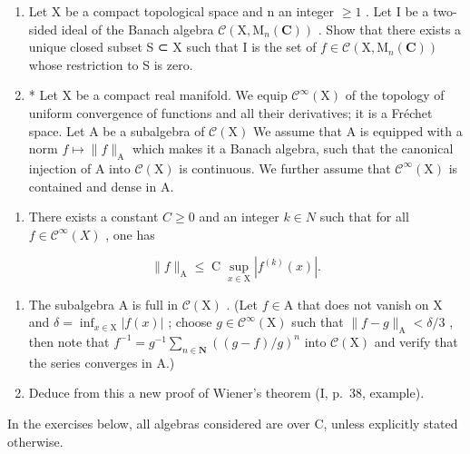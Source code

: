 \begin{enumerate}
\def\labelenumi{\arabic{enumi})}
\setcounter{enumi}{27}
\item
  Let X be a compact topological space and n an integer \(\geqslant 1\) . Let I be a two-sided ideal of the Banach algebra \(\mathcal{C}(\mathrm{X},\mathrm{M}_{n}(\mathbf{C}))\) . Show that there exists a unique closed subset S ⊂ X such that I is the set of \(f \in \mathcal{C}(\mathrm{X}, \mathrm{M}_{n}(\mathbf{C}))\) whose restriction to S is zero.
\item
  * Let X be a compact real manifold. We equip \(\mathcal{C}^{\infty}(\mathrm{X})\) of the topology of uniform convergence of functions and all their derivatives; it is a Fréchet space. Let A be a subalgebra of \(\mathcal{C}(\mathrm{X})\) We assume that A is equipped with a norm \(f \mapsto \| f\|_{\mathrm{A}}\) which makes it a Banach algebra, such that the canonical injection of A into \(\mathcal{C}(\mathrm{X})\) is continuous. We further assume that \(\mathcal{C}^{\infty}(\mathrm{X})\) is contained and dense in A.
\end{enumerate}

\begin{enumerate}
\def\labelenumi{\alph{enumi})}
\tightlist
\item
  There exists a constant \(C \geqslant 0\) and an integer \(k \in N\) such that for all \(f \in \mathcal{C}^{\infty}(X)\) , one has
\end{enumerate}

\[
\| f \| _ {\mathrm{A}} \leqslant \operatorname * {C} \sup _ {x \in \mathrm{X}} | f ^ {(k)} (x) |.
\]

\begin{enumerate}
\def\labelenumi{\alph{enumi})}
\setcounter{enumi}{1}
\item
  The subalgebra A is full in \(\mathcal{C}(\mathrm{X})\) . (Let \(f \in \mathrm{A}\) that does not vanish on X and \(\delta = \inf_{x \in \mathrm{X}} |f(x)|\) ; choose \(g \in \mathcal{C}^{\infty}(\mathrm{X})\) such that \(\|f - g\|_{\mathrm{A}} < \delta/3\) , then note that \(f^{-1} = g^{-1} \sum_{n \in \mathbf{N}} ((g - f)/g)^{n}\) into \(\mathcal{C}(\mathrm{X})\) and verify that the series converges in A.)
\item
  Deduce from this a new proof of Wiener's theorem (I, p.~38, example).
\end{enumerate}


In the exercises below, all algebras considered are over C, unless explicitly stated otherwise.

